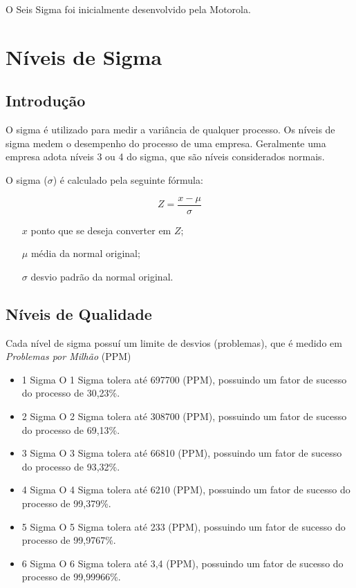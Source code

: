 \documentclass{abnt}
\begin{document}
	O Seis Sigma foi inicialmente desenvolvido pela Motorola.
	
	\chapter {Níveis de Sigma}
		\section {Introdução}
			O sigma é utilizado para medir a variância de qualquer processo. Os níveis de sigma medem o desempenho do processo de uma empresa.
			Geralmente uma empresa adota níveis 3 ou 4 do sigma, que são níveis considerados normais.
			
			O sigma ($\sigma$) é calculado pela seguinte fórmula: 
			\begin{center}
			    \begin{equation}
			       Z = \frac{x - \mu}{\sigma}
		        \end{equation}
		     	\begin{itemize}
		     		\item[$x$] ponto que se deseja converter em $Z$;
		     		\item[$\mu$] média da normal original;
		     		\item[$\sigma$] desvio padrão da normal original.
		     	\end{itemize}
			\end{center}
			
			 
		\section {Níveis de Qualidade}
		    Cada nível de sigma possuí um limite de desvios (problemas), que é medido em  \textit{Problemas por Milhão} (PPM) 
			\begin{itemize}
			    \item {1 Sigma}
			        \subitem O 1 Sigma tolera até 697700 (PPM), possuindo um fator de sucesso do processo de 30,23\%. 
			    \item {2 Sigma}
			        \subitem O 2 Sigma tolera até 308700 (PPM), possuindo um fator de sucesso do processo de 69,13\%.
			    \item {3 Sigma}
			        \subitem O 3 Sigma tolera até 66810 (PPM), possuindo um fator de sucesso do processo de 93,32\%.
			    \item {4 Sigma}
			        \subitem O 4 Sigma tolera até 6210 (PPM), possuindo um fator de sucesso do processo de 99,379\%.
			    \item {5 Sigma}
			        \subitem O 5 Sigma tolera até 233 (PPM), possuindo um fator de sucesso do processo de 99,9767\%.
			    \item {6 Sigma}
			        \subitem O 6 Sigma tolera até 3,4 (PPM), possuindo um fator de sucesso do processo de 99,99966\%.
			\end{itemize}
			
\end{document}
